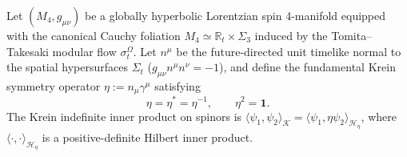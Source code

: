\documentclass[11pt,a4paper]{article}
\theoremstyle{plain}
\theoremstyle{definition}
\theoremstyle{remark}
\newcommand{\K}{\mathcal{K}}
\newcommand{\Hilb}{\mathcal{H}}
\newcommand{\R}{\mathbb{R}}
\begin{document}
Let $(M_4, g_{\mu\nu})$ be a globally hyperbolic Lorentzian spin 4-manifold equipped with the canonical Cauchy foliation $M_4 \simeq \R_t \times \Sigma_3$ induced by the Tomita--Takesaki modular flow $\sigma_t^\Omega$. Let $n^\mu$ be the future-directed unit timelike normal to the spatial hypersurfaces $\Sigma_t$ ($g_{\mu\nu} n^\mu n^\nu = -1$), and define the fundamental Krein symmetry operator $\eta := n_\mu \gamma^\mu$ satisfying
\begin{equation}
  \eta = \eta^* = \eta^{-1}, \qquad \eta^2 = \mathbf{1}.
\end{equation}
The Krein indefinite inner product on spinors is $\langle \psi_1, \psi_2 \rangle_{\K} = \langle \psi_1, \eta \psi_2 \rangle_{\Hilb_\eta}$, where $\langle \cdot, \cdot \rangle_{\Hilb_\eta}$ is a positive-definite Hilbert inner product.
\end{document}
